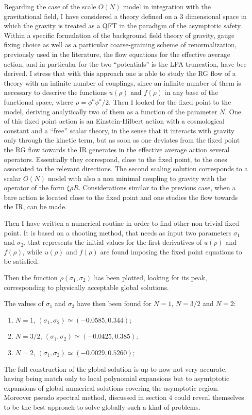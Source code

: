 Regarding the case of the scale $O(N)$ model in integration with the gravitational field, I have considered a theory defined on a $3$ dimensional space in which the gravity is treated as a QFT in the 
paradigm of the asymptotic safety. Within a specific formulation of the background field theory of gravity, gauge fixing choice as well as a particular coarse-graining scheme of renormalization, 
previously used in the literature, the flow equations for the effective average action, and in particular for the two ``potentials'' is the LPA truncation, have bee derived.
I stress that with this approach one is able to study the RG flow of a theory with an infinite number of couplings, since an infinite number of them is necessary to descrive the functions $u(\rho)$ 
and $f(\rho)$ in any base of the functional space, where $\rho=\phi^a \phi^a/2$.
Then I looked for the fixed point to the model, deriving analytically two of them as a function of the parameter $N$.
One of this fixed point action is an Einstein-Hilbert action with a cosmological constant and a ``free'' scalar theory, in the sense that it interacts with gravity only through the kinetic term,
but as soon as one deviates from the fixed point the RG flow towards the IR generates in the effective average action several operators. Essentially they correspond, close to the fixed point, to the ones associated to the relevant directions.
The second scaling solution corresponds to a scalar $O(N)$ model with also a non minimal coupling to gravity with the operator of the form $\xi \rho R$. 
Considerations similar to the previous case, when a bare action is located close to the fixed point and one studies the flow towards the IR, can be made.

Then  I have written a numerical routine in order to find other non trivial fixed point. It is based on a shooting method, that needs as input two  parameters $\sigma_1$ and $\sigma_2$, that represents the initial values for the first derivatives 
of $u(\rho)$ and $f(\rho)$, while $u(\rho)$ and $f(\rho)$ are found imposing the fixed point equations to be satisfied.

Then the function $\rho(\sigma_1, \sigma_2)$ has been plotted, looking for its peak,
corresponding to physically acceptable global solutions.

The values of $\sigma_1$ and $\sigma_2$ have then been found for $N=1$, $N=3/2$ and $N=2$:
\begin{enumerate}
 \item $N=1$, $(\sigma_1, \sigma_2) \simeq (-0.0585, 0.344)$;
 \item $N=3/2$, $(\sigma_1, \sigma_2) \simeq (-0.0425, 0.385)$;
 \item $N=2$, $(\sigma_1, \sigma_2) \simeq (-0.0029, 0.5260)$;
\end{enumerate}
The full construction of the global solution is up to now not very accurate, having being match only to local polynomial expansions but to asymtptotic expansions of global numerical solutions covering the asymptotic region.
Moreover pseudo spectral method, discussed in section 4 could reveal themselves to be the best approach to solve globally such a kind of problems. 

